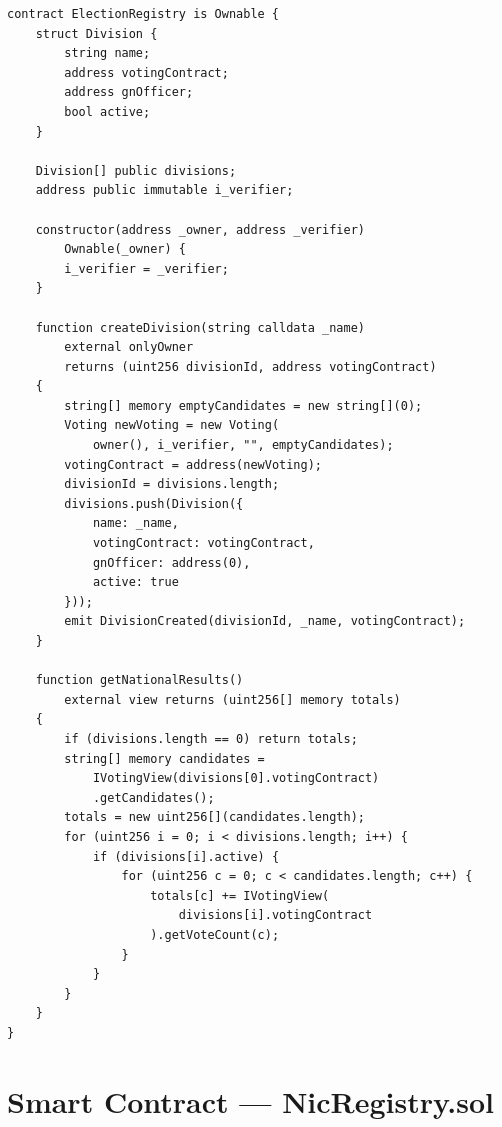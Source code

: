 \begin{lstlisting}[caption={ElectionRegistry.sol --- Division factory and aggregation}]
contract ElectionRegistry is Ownable {
    struct Division {
        string name;
        address votingContract;
        address gnOfficer;
        bool active;
    }

    Division[] public divisions;
    address public immutable i_verifier;

    constructor(address _owner, address _verifier)
        Ownable(_owner) {
        i_verifier = _verifier;
    }

    function createDivision(string calldata _name)
        external onlyOwner
        returns (uint256 divisionId, address votingContract)
    {
        string[] memory emptyCandidates = new string[](0);
        Voting newVoting = new Voting(
            owner(), i_verifier, "", emptyCandidates);
        votingContract = address(newVoting);
        divisionId = divisions.length;
        divisions.push(Division({
            name: _name,
            votingContract: votingContract,
            gnOfficer: address(0),
            active: true
        }));
        emit DivisionCreated(divisionId, _name, votingContract);
    }

    function getNationalResults()
        external view returns (uint256[] memory totals)
    {
        if (divisions.length == 0) return totals;
        string[] memory candidates =
            IVotingView(divisions[0].votingContract)
            .getCandidates();
        totals = new uint256[](candidates.length);
        for (uint256 i = 0; i < divisions.length; i++) {
            if (divisions[i].active) {
                for (uint256 c = 0; c < candidates.length; c++) {
                    totals[c] += IVotingView(
                        divisions[i].votingContract
                    ).getVoteCount(c);
                }
            }
        }
    }
}
\end{lstlisting}

\section{Smart Contract --- NicRegistry.sol}

